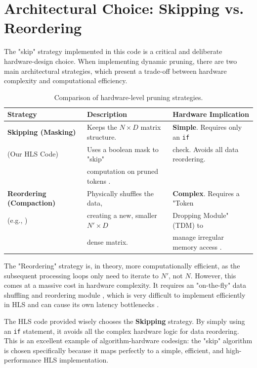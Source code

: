 \section{Architectural Choice: Skipping vs. Reordering}

The "skip" strategy implemented in this code is a critical and deliberate hardware-design choice. When implementing dynamic pruning, there are two main architectural strategies, which present a trade-off between hardware complexity and computational efficiency.

\begin{table}[h!]
    \centering
    \begin{tabular}{|l|l|l|}
        \hline
        \textbf{Strategy} & \textbf{Description} & \textbf{Hardware Implication} \\
        \hline
        \textbf{Skipping (Masking)} & Keeps the $N \times D$ matrix structure. & \textbf{Simple}. Requires only an \texttt{if} \\
        (Our HLS Code) & Uses a boolean mask to "skip" & check. Avoids all data reordering. \\
        & computation on pruned tokens \cite{ref10}. & \\
        \hline
        \textbf{Reordering (Compaction)} & Physically shuffles the data, & \textbf{Complex}. Requires a "Token \\
        (e.g., \cite{ref6, ref13}) & creating a new, smaller $N' \times D$ & Dropping Module" (TDM) \cite{ref5} to \\
        & dense matrix. & manage irregular memory access \cite{ref4}. \\
        \hline
    \end{tabular}
    \caption{Comparison of hardware-level pruning strategies.}
    \label{table:pruning_strategies}
\end{table}

The "Reordering" strategy is, in theory, more computationally efficient, as the subsequent processing loops only need to iterate to $N'$, not $N$. However, this comes at a massive cost in hardware complexity. It requires an "on-the-fly" data shuffling and reordering module \cite{ref5, ref6}, which is very difficult to implement efficiently in HLS and can cause its own latency bottlenecks \cite{ref12}.

The HLS code provided wisely chooses the \textbf{Skipping} strategy. By simply using an \texttt{if} statement, it avoids all the complex hardware logic for data reordering. This is an excellent example of algorithm-hardware codesign: the "skip" algorithm is chosen specifically because it maps perfectly to a simple, efficient, and high-performance HLS implementation.
